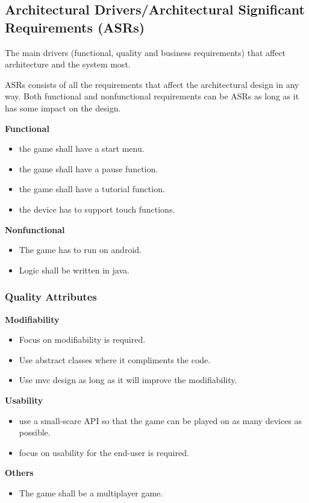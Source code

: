 \subsection{Architectural Drivers/Architectural Significant Requirements (ASRs)}
The main drivers (functional, quality and business requirements) that affect architecture and the system most.

ASRs consists of all the requirements that affect the architectural design in any way. Both functional and nonfunctional requirements can be ASRs as long as it has some impact on the design.


\textbf{Functional} 
\begin{itemize}
	\item the game shall have a start menu.
	\item the game shall have a pause function.
	\item the game shall have a tutorial function.
	\item the device has to support touch functions.
\end{itemize}

\textbf{Nonfunctional}
\begin{itemize}
	\item The game has to run on android.
	\item Logic shall be written in java.
\end{itemize}

\subsubsection{Quality Attributes}

\textbf{Modifiability}
\begin{itemize}
	\item Focus on modifiability is required.
	\item Use abstract classes where it compliments the code.
	\item Use mvc design as long as it will improve the modifiability.
\end{itemize}

\textbf{Usability}
\begin{itemize}
	\item use a small-scare API so that the game can be played on as many devices as possible.
	\item focus on usability for the end-user is required.
\end{itemize}

\textbf{Others}
\begin{itemize}
	\item The game shall be a multiplayer game.
\end{itemize}